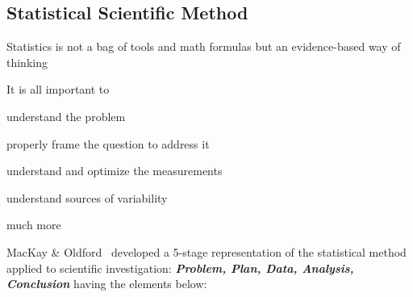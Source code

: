 \subsection{Statistical Scientific Method}
\bi
\item Statistics is not a bag of tools and math formulas but an
  evidence-based way of thinking 
\item It is all important to
  \bi
   \item understand the problem
   \item properly frame the question to address it
   \item understand and optimize the measurements
   \item understand sources of variability
   \item much more
     \ei
\item MacKay \& Oldford~\cite{mac00sci} developed a 5-stage
  representation of the statistical method applied to scientific
  investigation: \textbf{\emph{Problem, Plan, Data, Analysis,
      Conclusion}} having the elements below:
  \ei

